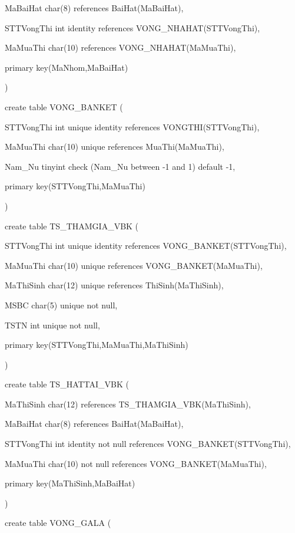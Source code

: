 \documentclass{report}
\begin{document}
	MaBaiHat char(8) references BaiHat(MaBaiHat),
	
	STTVongThi int identity references VONG\_NHAHAT(STTVongThi),
	
	MaMuaThi char(10) references VONG\_NHAHAT(MaMuaThi),
	
	primary key(MaNhom,MaBaiHat)
	
	\setlength{\parindent}{0.5cm}
)

\bigskip

create table VONG\_BANKET (

	\setlength{\parindent}{1.5cm}
	STTVongThi int unique identity references VONGTHI(STTVongThi),
	
	MaMuaThi char(10) unique references MuaThi(MaMuaThi),
	
	Nam\_Nu tinyint check (Nam\_Nu between -1 and 1) default -1,
	
	primary key(STTVongThi,MaMuaThi)
	
	\setlength{\parindent}{0.5cm}
)

\bigskip

create table TS\_THAMGIA\_VBK (

	\setlength{\parindent}{1.5cm}
	STTVongThi int unique identity references VONG\_BANKET(STTVongThi),
	
	MaMuaThi char(10) unique references VONG\_BANKET(MaMuaThi),
	
	MaThiSinh char(12) unique references ThiSinh(MaThiSinh),
	
	MSBC char(5) unique not null,
	
	TSTN int unique not null,
	
	primary key(STTVongThi,MaMuaThi,MaThiSinh)
	
	\setlength{\parindent}{0.5cm}
)

\bigskip

create table TS\_HATTAI\_VBK (

	\setlength{\parindent}{1.5cm}
	MaThiSinh char(12) references TS\_THAMGIA\_VBK(MaThiSinh),
	
	MaBaiHat char(8) references BaiHat(MaBaiHat),
	
	STTVongThi int identity not null references VONG\_BANKET(STTVongThi),
	
	MaMuaThi char(10) not null references VONG\_BANKET(MaMuaThi),
	
	primary key(MaThiSinh,MaBaiHat)
	
	\setlength{\parindent}{0.5cm}
)

\bigskip

create table VONG\_GALA (
\end{document}
